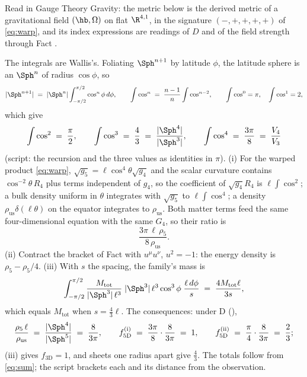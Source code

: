 Read in Gauge Theory Gravity: the metric below is the derived metric of a gravitational field $(\hb, \Omega)$ on flat $\R^{4,1}$, in the signature $(-,+,+,+,+)$ of \eqref{eq:warp}, and its index expressions are readings of $D$ and of the field strength through Fact .

The integrals are Wallis's. Foliating $\Sph^{n+1}$ by latitude $\phi$, the latitude sphere is an $\Sph^{n}$ of radius $\cos\phi$, so
\[
|\Sph^{n+1}| \;=\; |\Sph^{n}|\int_{-\pi/2}^{\pi/2}\cos^{n}\phi\,d\phi, \qquad \int\cos^{n} \;=\; \frac{n-1}{n}\int\cos^{n-2}, \qquad \int\cos^{0} = \pi, \quad \int\cos^{1} = 2,
\]
which give
\[
\int\cos^{2} \;=\; \frac{\pi}{2}, \qquad \int\cos^{3} \;=\; \frac{4}{3} \;=\; \frac{|\Sph^{4}|}{|\Sph^{3}|}, \qquad \int\cos^{4} \;=\; \frac{3\pi}{8} \;=\; \frac{V_{4}}{V_{3}}
\]
(script: the recursion and the three values as identities in $\pi$). (i) For the warped product \eqref{eq:warp}, $\sqrt{g_{5}} = \ell\cos^{4}\theta\sqrt{g_{4}}$ and the scalar curvature contains $\cos^{-2}\theta\,R_{4}$ plus terms independent of $g_{4}$, so the coefficient of $\sqrt{g_{4}}R_{4}$ is $\ell\int\cos^{2}$; a bulk density uniform in $\theta$ integrates with $\sqrt{g_{5}}$ to $\ell\int\cos^{4}$; a density $\rho_{\mathrm{us}}\delta(\ell\theta)$ on the equator integrates to $\rho_{\mathrm{us}}$. Both matter terms feed the same four-dimensional equation with the same $G_{4}$, so their ratio is
\[
\frac{3\pi\,\ell\,\rho_{5}}{8\,\rho_{\mathrm{us}}}.
\]
(ii) Contract the bracket of Fact  with $u^{\mu}u^{\nu}$, $u^{2} = -1$: the energy density is $\rho_{5} - \rho_{5}/4$. (iii) With $s$ the spacing, the family's mass is
\[
\int_{-\pi/2}^{\pi/2}\frac{M_{\mathrm{tot}}}{|\Sph^{3}|\,\ell^{3}}\;|\Sph^{3}|\,\ell^{3}\cos^{3}\phi\;\frac{\ell\,d\phi}{s}
\;=\; \frac{4M_{\mathrm{tot}}\ell}{3s},
\]
which equals $M_{\mathrm{tot}}$ when $s = \tfrac{4}{3}\ell$. The consequences: under D (),
\[
\frac{\rho_{5}\,\ell}{\rho_{\mathrm{us}}} \;=\; \frac{|\Sph^{4}|}{|\Sph^{5}|} \;=\; \frac{8}{3\pi}, \qquad
f_{5\mathrm{D}}^{\mathrm{(i)}} \;=\; \frac{3\pi}{8}\cdot\frac{8}{3\pi} \;=\; 1, \qquad
f_{5\mathrm{D}}^{\mathrm{(ii)}} \;=\; \frac{\pi}{4}\cdot\frac{8}{3\pi} \;=\; \frac{2}{3};
\]
(iii) gives $f_{3\mathrm{D}} = 1$, and sheets one radius apart give $\tfrac{4}{3}$. The totals follow from \eqref{eq:sum}; the script brackets each and its distance from the observation.
